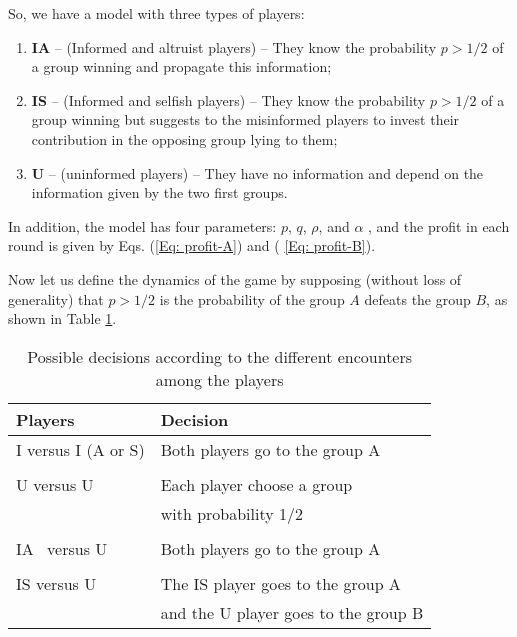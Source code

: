 \documentclass[3p, 11pt]{elsarticle}
\begin{document}
So, we have a model with three types of players:

\begin{enumerate}
\item \textbf{IA} -- (Informed and altruist players) -- They know the
probability $p>1/2$ of a group winning and propagate this information;

\item \textbf{IS} -- (Informed and selfish players) -- They know the
probability $p>1/2$ of a group winning but suggests to the misinformed
players to invest their contribution in the opposing group lying to them;

\item \textbf{U} -- (uninformed players) -- They have no information and
depend on the information given by the two first groups.
\end{enumerate}

In addition, the model has four parameters: $p$, $q$, $\rho $, and $\alpha $%
, and the profit in each round is given by Eqs. (\ref{Eq: profit-A}) and (%
\ref{Eq: profit-B}).

Now let us define the dynamics of the game by supposing (without loss of
generality) that $p>1/2$ is the probability of the group $A$ defeats the
group $B$, as shown in Table \ref{encounters}.

\begin{table}[tbp] \centering%
\begin{tabular}{ll}
\hline\hline
\textbf{Players} & \textbf{Decision} \\ \hline
I versus I (A or S) & Both players go to the group A \\ 
&  \\ 
U versus U & Each player choose a group \\ 
& with probability 1/2 \\ 
&  \\ 
IA \ versus U & Both players go to the group A \\ 
&  \\ 
IS versus U & The IS player goes to the group A \\ 
& and the U player goes to the group B \\ \hline\hline
\end{tabular}%
\caption{Possible decisions according to the different encounters among the
players\label{encounters}}%
\end{table}%
\end{document}
